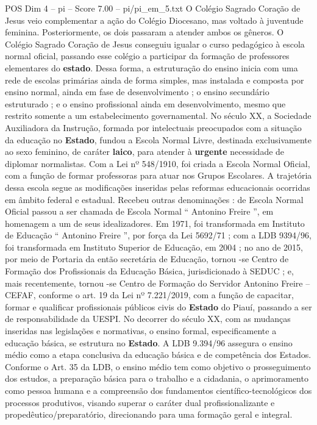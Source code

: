 \begin{textsample}{POS Dim 4 – pi – Score 7.00 – pi/pi\_em\_5.txt}
O Colégio Sagrado Coração de Jesus veio complementar a ação do Colégio Diocesano, mas voltado à juventude feminina.
Posteriormente, os dois passaram a atender ambos os gêneros.
O Colégio Sagrado Coração de Jesus conseguiu igualar o curso pedagógico à escola normal oficial, passando esse colégio a participar da formação de professores elementares do \textbf{estado}.
Dessa forma, a estruturação do ensino inicia com uma rede de escolas primárias ainda de forma simples, mas instalada e composta por ensino normal, ainda em fase de desenvolvimento ; o ensino secundário estruturado ; e o ensino profissional ainda em desenvolvimento, mesmo que restrito somente a um estabelecimento governamental.
No século XX, a Sociedade Auxiliadora da Instrução, formada por intelectuais preocupados com a situação da educação no \textbf{Estado}, fundou a Escola Normal Livre, destinada exclusivamente ao sexo feminino, de caráter \textbf{laico}, para atender à \textbf{urgente} necessidade de diplomar normalistas.
Com a Lei nº 548/1910, foi criada a Escola Normal Oficial, com a função de formar professoras para atuar nos Grupos Escolares.
A trajetória dessa escola segue as modificações inseridas pelas reformas educacionais ocorridas em âmbito federal e estadual.
Recebeu outras denominações : de Escola Normal Oficial passou a ser chamada de Escola Normal “ Antonino Freire ”, em homenagem a um de seus idealizadores.
Em 1971, foi transformada em Instituto de Educação “ Antonino Freire ”, por força da Lei 5692/71 ; com a LDB 9394/96, foi transformada em Instituto Superior de Educação, em 2004 ; no ano de 2015, por meio de Portaria da então secretária de Educação, tornou -se Centro de Formação dos Profissionais da Educação Básica, jurisdicionado à SEDUC ; e, mais recentemente, tornou -se Centro de Formação do Servidor Antonino Freire – CEFAF, conforme o art. 19 da Lei nº 7.221/2019, com a função de capacitar, formar e qualificar profissionais públicos civis do \textbf{Estado} do Piauí, passando a ser de responsabilidade da UESPI.
No decorrer do século XX, com as mudanças inseridas nas legislações e normativas, o ensino formal, especificamente a educação básica, se estrutura no \textbf{Estado}.
A LDB 9.394/96 assegura o ensino médio como a etapa conclusiva da educação básica e de competência dos Estados.
Conforme o Art. 35 da LDB, o ensino médio tem como objetivo o prosseguimento dos estudos, a preparação básica para o trabalho e a cidadania, o aprimoramento como pessoa humana e a compreensão dos fundamentos científico-tecnológicos dos processos produtivos, visando superar o caráter dual profissionalizante e propedêutico/preparatório, direcionando para uma formação geral e integral.

\end{textsample}
